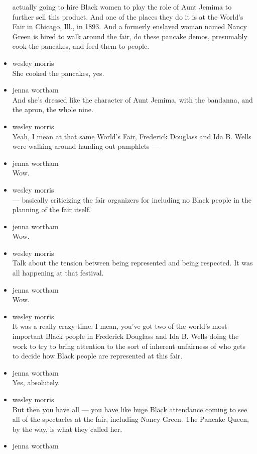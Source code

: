\begin{itemize}
  actually going to hire Black women to play the role of Aunt Jemima to
  further sell this product. And one of the places they do it is at the
  World's Fair in Chicago, Ill., in 1893. And a formerly enslaved woman
  named Nancy Green is hired to walk around the fair, do these pancake
  demos, presumably cook the pancakes, and feed them to people.
\item
  wesley morris\\
  She cooked the pancakes, yes.
\item
  jenna wortham\\
  And she's dressed like the character of Aunt Jemima, with the
  bandanna, and the apron, the whole nine.
\item
  wesley morris\\
  Yeah, I mean at that same World's Fair, Frederick Douglass and Ida B.
  Wells were walking around handing out pamphlets ---
\item
  jenna wortham\\
  Wow.
\item
  wesley morris\\
  --- basically criticizing the fair organizers for including no Black
  people in the planning of the fair itself.
\item
  jenna wortham\\
  Wow.
\item
  wesley morris\\
  Talk about the tension between being represented and being respected.
  It was all happening at that festival.
\item
  jenna wortham\\
  Wow.
\item
  wesley morris\\
  It was a really crazy time. I mean, you've got two of the world's most
  important Black people in Frederick Douglass and Ida B. Wells doing
  the work to try to bring attention to the sort of inherent unfairness
  of who gets to decide how Black people are represented at this fair.
\item
  jenna wortham\\
  Yes, absolutely.
\item
  wesley morris\\
  But then you have all --- you have like huge Black attendance coming
  to see all of the spectacles at the fair, including Nancy Green. The
  Pancake Queen, by the way, is what they called her.
\item
  jenna wortham\\

\end{itemize}
